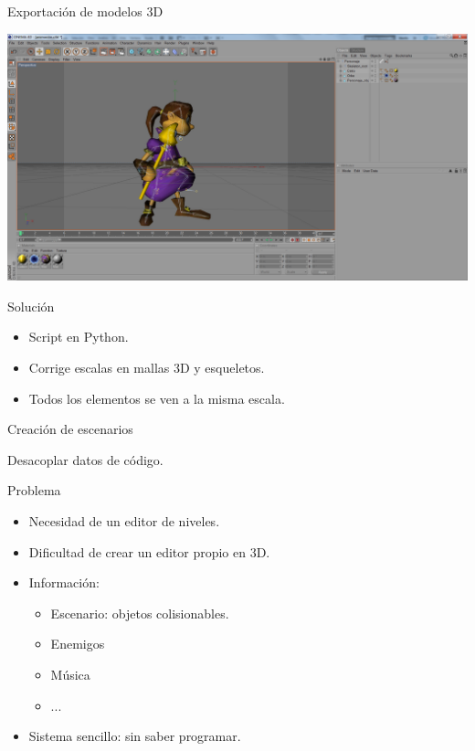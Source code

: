 \documentclass[green]{beamer}
\begin{document}
\begin{frame}{Exportación de modelos 3D}

    \begin{center}
	\includegraphics[scale=0.13]{img/cinema4d-personaje.png}
    \end{center}

    \begin{block}{Solución}
	\begin{itemize}
	    \item Script en Python.
	    \item Corrige escalas en mallas 3D y esqueletos.
	    \item Todos los elementos se ven a la misma escala.
	\end{itemize}
    \end{block}
\end{frame}
    
    
\begin{frame}{Creación de escenarios}

Desacoplar datos de código.

    \begin{alertblock}{Problema}
	\begin{itemize}
	    \item Necesidad de un editor de niveles.
	    \item Dificultad de crear un editor propio en 3D.
	    \item Información:
	    \begin{itemize}
		\item Escenario: objetos colisionables.
		\item Enemigos
		\item Música
		\item ...
	    \end{itemize}
	    \item Sistema sencillo: sin saber programar.
	\end{itemize}
    \end{alertblock}
\end{frame}
\end{document}
